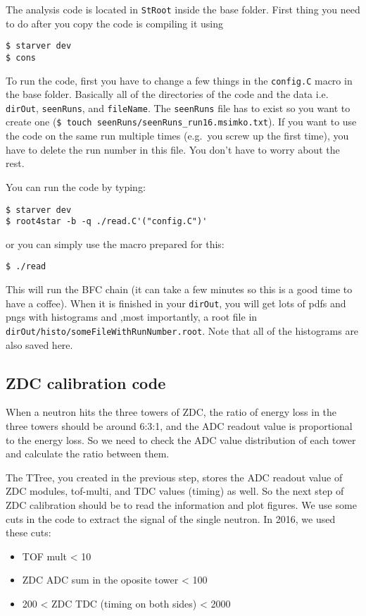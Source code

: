 The analysis code is located in \texttt{StRoot} inside the base folder. First thing you need to do after you
copy the code is compiling it using
\begin{verbatim}
$ starver dev
$ cons
\end{verbatim}
To run the code, first you have to change a few things in the \texttt{config.C} macro in the base folder. 
Basically all of the
directories of the code and the data i.e. \texttt{dirOut}, \texttt{seenRuns}, and \texttt{fileName}. 
The \texttt{seenRuns} file has to
exist so you want to create one (\texttt{\$ touch seenRuns/seenRuns\_run16.msimko.txt}). If you want to use the code
on the same run multiple times (e.g.\ you screw up the first time), you have to delete the run number in
this file. You don't have to worry
about the rest.

You can run the code by typing:
\begin{verbatim}
$ starver dev
$ root4star -b -q ./read.C'("config.C")'
\end{verbatim}
or you can simply use the macro prepared for this:
\begin{verbatim}
$ ./read
\end{verbatim}
This will run the BFC chain (it can take a few minutes so this is a good time to have a coffee). When it is finished
in your \texttt{dirOut}, you will get lots of pdfs and pngs with histograms and ,most importantly, a root file in
\texttt{dirOut/histo/someFileWithRunNumber.root}. Note that all of the histograms are also saved here.

\subsection{ZDC calibration code}\hypertarget{zdc-calibration-code}{}\label{zdc-calibration-code}

When a neutron hits the three towers of ZDC, the ratio of energy loss in the three towers should be 
around 6:3:1, and the ADC readout value is proportional to the energy loss. So we need to check the ADC value 
distribution of each tower and calculate the ratio between them.

The TTree, you created in the previous step, stores the ADC readout value of ZDC modules, tof-multi, and
TDC values (timing) as well. 
So the next step of ZDC calibration
should be to read the information and plot figures.
We use some cuts in the code to extract the signal of the single neutron. In 2016, we used these cuts:

\begin{itemize}
\item TOF mult \textless{} 10
\item ZDC ADC sum in the oposite tower \textless{} 100
\item 200 \textless{} ZDC TDC (timing on both sides) \textless{} 2000
\end{itemize}

